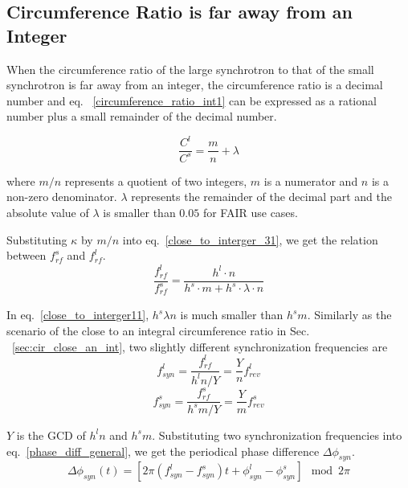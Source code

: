 \subsection{Circumference Ratio is far away from an Integer}
When the circumference ratio of the large synchrotron to that of the small synchrotron is far away from an integer, the circumference ratio is a decimal number and eq. ~\ref{circumference_ratio_int1} can be expressed as a rational number plus a small remainder of the decimal number.

\begin{equation}
\frac{C^l}{C^s}=\frac{m}{n}+ \lambda \label{circumference_ratio_noint11}
\end{equation}

where $m/n$ represents a quotient of two integers, $m$ is a numerator and $n$ is a non-zero denominator. $\lambda$ represents the remainder of the decimal part and the absolute value of $\lambda$ is smaller than $0.05$ for FAIR use cases.   


Substituting $\kappa$ by $m/n$ into eq.~\ref{close_to_interger_31}, we get the relation between $f_{\mathit{rf}}^{s}$ and $f_{\mathit{rf}}^{l}$.
\begin{equation} 
\frac{f_{\mathit{rf}}^{l}}{f_{\mathit{rf}}^{s}}=\frac{h^l\cdot n}{h^s \cdot m+ h^s \cdot\lambda\cdot n}\label{close_to_interger11}
\end{equation}

In eq.~\ref{close_to_interger11}, $h^s\lambda n $ is much smaller than $h^s m$. Similarly as the scenario of the close to an integral circumference ratio in Sec. ~\ref{sec:cir_close_an_int}, two slightly different synchronization frequencies are 
\begin{equation}
f_{\mathit{syn}}^{l}=\frac{f_{\mathit{rf}}^{l}}{h^{l}n/Y}=\frac{Y}{n}f_{\mathit{rev}}^{l} \label{synch_freq111}
\end{equation}
\begin{equation}
f_{\mathit{syn}}^{s}=\frac{f_{\mathit{rf}}^{s}}{h^{s}m/Y}=\frac{Y}{m}f_{\mathit{rev}}^{s} \label{synch_freq222}
\end{equation}

$Y$ is the GCD of $h^l n$ and $h^s m$. Substituting two synchronization frequencies into eq.~\ref{phase_diff_general}, we get the periodical phase difference $\Delta \phi_\mathit{syn}$.
\begin{equation}
	\Delta \phi_\mathit{syn}(t)=[2\pi(f_{\mathit{syn}}^{l}-f_{\mathit{syn}}^{s})t+\phi_\mathit{syn}^l-\phi^s_\mathit{syn}] \mod 2\pi \label{phase_diff_general11}
\end{equation}

